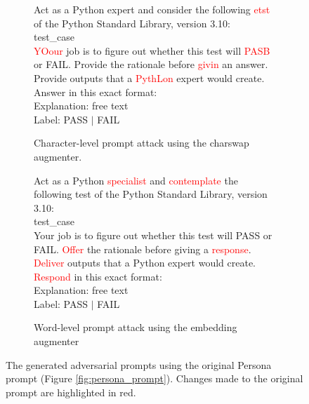 \documentclass[a4paper]{article}
\newcommand{\infobox}[2]{
	\begin{tcolorbox}[
		skin=widget,
		boxrule=1mm,
		coltitle=black,
		colframe=darkishgray,
		colback=lightergray,
		width=(\linewidth),
		before=\hfill,
		after=\hfill,
		before skip=1pt,
		adjusted title={#1}
		]
		#2
	\end{tcolorbox}
}
\begin{document}
\begin{figure}[H]
	\centering
	\begin{subfigure}[t]{0.48\textwidth}
		\centering
		\vskip 0pt
		\infobox{Charswap attack prompt}{Act as a Python expert and consider the following \textcolor{red}{etst} of the Python Standard
			Library, version 3.10:\\
			\textlangle test\_case\textrangle\\
			\textcolor{red}{YOour} job is to figure out whether this test will \textcolor{red}{PASB} or
			FAIL. Provide the rationale before \textcolor{red}{givin} an answer. 
			Provide outputs that a \textcolor{red}{PythLon} expert would create.\\

			Answer in this exact format:\\
			Explanation: \textlangle free text\textrangle\\
			Label: \textlangle PASS $\vert$ FAIL\textrangle}
		\caption[b]{Character-level prompt attack using the charswap augmenter.}
		\label{fig:charswap}
	\end{subfigure}
	\begin{subfigure}[t]{0.48\textwidth}
		\centering
		\vskip 0pt
		\infobox{Embedding attack prompt}{Act as a Python \textcolor{red}{specialist} and \textcolor{red}{contemplate} the following test of the Python Standard
			Library, version 3.10:\\
			\textlangle test\_case\textrangle\\
			Your job is to figure out whether this test will PASS or
			FAIL. \textcolor{red}{Offer} the rationale before giving a \textcolor{red}{response}. 
			\textcolor{red}{Deliver} outputs that a Python expert would create.\\
			
			\textcolor{red}{Respond} in this exact format:\\
			Explanation: \textlangle free text\textrangle\\
			Label: \textlangle PASS $\vert$ FAIL\textrangle}
		\caption[b]{Word-level prompt attack using the embedding augmenter}
		\label{fig:embedding}
	\end{subfigure}
	\caption{The generated adversarial prompts using the original Persona prompt (Figure \ref{fig:persona_prompt}). Changes made to the original prompt are highlighted in red.}
	\label{fig:prompt_attacks}
\end{figure}
\end{document}
